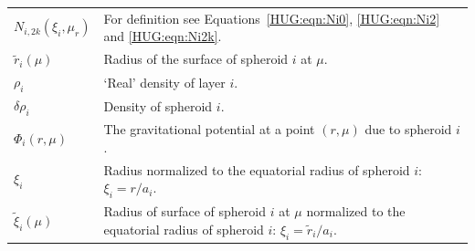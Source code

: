 \documentclass[11pt, oneside]{article}   	%
\begin{document}
\begin{longtable}{l p{12cm}}
$N_{i, 2k} (\xi_i, \mu_r)$ & For definition see Equations~\ref{HUG:eqn:Ni0}, \ref{HUG:eqn:Ni2} and \ref{HUG:eqn:Ni2k}.\\
$\tilde{r}_i (\mu)$ & Radius of the surface of spheroid $i$ at $\mu$.\\
$\rho_i$ & `Real' density of layer $i$. \\
$\delta \rho_i$ & Density of spheroid $i$. \\
$\Phi_i(r, \mu)$ & The gravitational potential at a point $(r, \mu)$ due to spheroid $i$. \\
$\xi_i$ & Radius normalized to the equatorial radius of spheroid $i$: $\xi_i = r/a_i $. \\
$\tilde{\xi}_i (\mu)$ & Radius of surface of spheroid $i$ at $\mu$ normalized to the equatorial radius of spheroid $i$: $\xi_i = \tilde{r}_i/a_i $. \\

\end{longtable}
\end{document}
